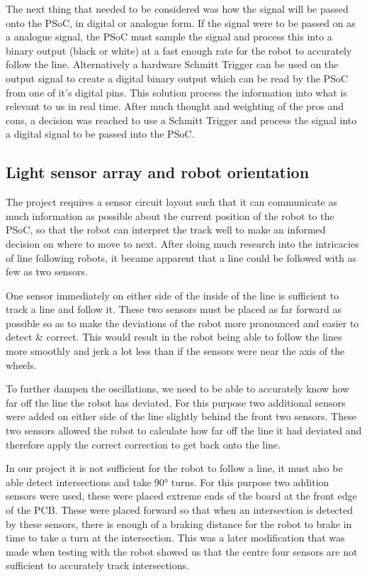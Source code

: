 \documentclass{article}
\begin{document}
The next thing that needed to be considered was how the signal will be passed onto the PSoC, in digital or analogue form. If the signal were to be passed on as a analogue signal, the PSoC must sample the signal and process this into a binary output (black or white) at a fast enough rate for the robot to accurately follow the line. Alternatively a hardware Schmitt Trigger can be used on the output signal to create a digital binary output which can be read by the PSoC from one of it's digital pins. This solution process the information into what is relevant to us in real time. After much thought and weighting of the pros and cons, a decision was reached to  use a Schmitt Trigger and process the signal into a digital signal to be passed into the PSoC.

\subsection{Light sensor array and robot orientation}

The project requires a sensor circuit layout such that it can communicate as much information as possible about the current position of the robot to the PSoC, so that the robot can interpret the track well to make an informed decision on where to move to next. After doing much research into the intricacies of line following robots, it became apparent that a line could be followed with as few as two sensors.

One sensor immediately on either side of the inside of the line is sufficient to track a line and follow it. These two sensors must be placed as far forward as possible so as to make the deviations of the robot more pronounced and easier to detect \& correct. This would result in the robot being able to follow the lines more smoothly and jerk a lot less than if the sensors were near the axis of the wheels. 

To further dampen the oscillations, we need to be able to accurately know how far off the line the robot has deviated. For this purpose two additional sensors were added on either side of the line slightly behind the front two sensors. These two sensors allowed the robot to calculate how far off the line it had deviated and therefore apply the correct correction to get back onto the line. 

In our project it is not sufficient for the robot to follow a line, it must also be able detect intersections and take 90° turns. For this purpose two addition sensors were used, these were placed extreme ends of the board at the front edge of the PCB. These were placed forward so that when an intersection is detected by these sensors, there is enough of a braking distance for the robot to brake in time to take a turn at the intersection. This was a later modification that was made when testing with the robot showed us that the centre four sensors are not sufficient to accurately track intersections.
\end{document}

